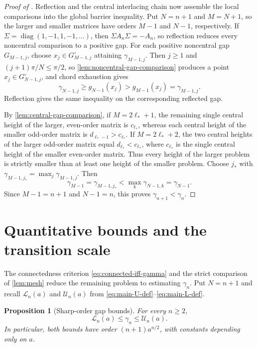 \documentclass[a4paper,preprint,12pt,nopreprintline,sort&compress]{elsarticle}
\numberwithin{equation}{section}
\newtheorem{proposition}[theorem]{Proposition}
\theoremstyle{remark}
\DeclareMathOperator{\diag}{diag}
\begin{document}
\begin{proof}[Proof of ]
Reflection and the central interlacing chain now assemble the local
comparisons into the global barrier inequality.  Put \(N=n+1\) and
\(M=N+1\), so the
larger and smaller matrices have orders \(M-1\) and \(N-1\), respectively.  If
\(\Sigma=\diag(1,-1,1,-1,\ldots)\), then
\(\Sigma A_n\Sigma=-A_n\), so reflection reduces every noncentral
comparison to a positive gap.  For each positive noncentral gap
\(G_{M-1,j}\), choose
\(x_j\in G_{M-1,j}^{\circ}\) attaining \(\gamma_{M-1,j}\).  Then
\(j\geq1\) and \((j+1)\pi/N\leq\pi/2\), so
\cref{lem:noncentral-gap-comparison} produces a point
\(\widehat x_j\in G_{N-1,j}^{\circ}\), and chord exhaustion gives
\[
 \gamma_{N-1,j}\geq g_{N-1}(\widehat x_j)
 >g_{M-1}(x_j)=\gamma_{M-1,j}.
\]
Reflection gives the same inequality on the corresponding reflected gap.

By \cref{lem:central-gap-comparison}, if \(M=2\ell_*+1\), the remaining
single central height of the larger, even-order matrix is \(c_{\ell_*}\),
whereas each central height of the
smaller odd-order matrix is \(d_{\ell_*-1}>c_{\ell_*}\).  If
\(M=2\ell_*+2\), the two central heights of the larger odd-order matrix
equal \(d_{\ell_*}<c_{\ell_*}\), where \(c_{\ell_*}\) is the single
central height of the smaller even-order matrix.
Thus every height of the larger problem is strictly smaller than at
least one height of the smaller problem.  Choose \(j_*\) with
\(\gamma_{M-1,j_*}=\max_j\gamma_{M-1,j}\).  Then
\[
 \gamma_{M-1}=\gamma_{M-1,j_*}
 <\max_k\gamma_{N-1,k}=\gamma_{N-1}.
\]
Since \(M-1=n+1\) and \(N-1=n\), this proves
\(\gamma_{n+1}<\gamma_n\).
\end{proof}

\section{Quantitative bounds and the transition scale}
\label{sec:topology-bounds}

The connectedness criterion \eqref{eq:connected-iff-gamma} and the strict
comparison of \cref{lem:mesh} reduce the remaining problem to estimating
\(\gamma_n\).  Put \(N=n+1\) and recall \(\mathcal L_n(a)\) and
\(\mathcal U_n(a)\) from
\eqref{eq:main-U-def}--\eqref{eq:main-L-def}.

\begin{proposition}[Sharp-order gap bounds]\label{prop:gap-bounds}
For every \(n\geq2\),
\begin{equation}\label{eq:gamma-LU}
 \mathcal L_n(a)\leq\gamma_n\leq\mathcal U_n(a).
\end{equation}
In particular, both bounds have order \((n+1)a^{n/2}\), with constants
depending only on \(a\).
\end{proposition}
\end{document}
